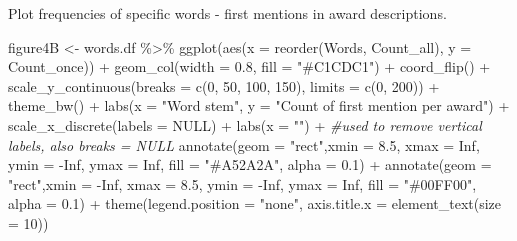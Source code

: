 \documentclass[
]{article}
\newenvironment{Shaded}{\begin{snugshade}}{\end{snugshade}}
\newcommand{\AttributeTok}[1]{\textcolor[rgb]{0.77,0.63,0.00}{#1}}
\newcommand{\CommentTok}[1]{\textcolor[rgb]{0.56,0.35,0.01}{\textit{#1}}}
\newcommand{\ConstantTok}[1]{\textcolor[rgb]{0.00,0.00,0.00}{#1}}
\newcommand{\DecValTok}[1]{\textcolor[rgb]{0.00,0.00,0.81}{#1}}
\newcommand{\FloatTok}[1]{\textcolor[rgb]{0.00,0.00,0.81}{#1}}
\newcommand{\FunctionTok}[1]{\textcolor[rgb]{0.00,0.00,0.00}{#1}}
\newcommand{\NormalTok}[1]{#1}
\newcommand{\OtherTok}[1]{\textcolor[rgb]{0.56,0.35,0.01}{#1}}
\newcommand{\SpecialCharTok}[1]{\textcolor[rgb]{0.00,0.00,0.00}{#1}}
\newcommand{\StringTok}[1]{\textcolor[rgb]{0.31,0.60,0.02}{#1}}
\begin{document}
Plot frequencies of specific words - first mentions in award
descriptions.

\begin{Shaded}
\begin{Highlighting}[]
\NormalTok{figure4B }\OtherTok{\textless{}{-}}\NormalTok{ words.df }\SpecialCharTok{\%\textgreater{}\%}
    \FunctionTok{ggplot}\NormalTok{(}\FunctionTok{aes}\NormalTok{(}\AttributeTok{x =} \FunctionTok{reorder}\NormalTok{(Words, Count\_all), }\AttributeTok{y =}\NormalTok{ Count\_once)) }\SpecialCharTok{+} 
    \FunctionTok{geom\_col}\NormalTok{(}\AttributeTok{width =} \FloatTok{0.8}\NormalTok{, }\AttributeTok{fill =} \StringTok{"\#C1CDC1"}\NormalTok{) }\SpecialCharTok{+}
    \FunctionTok{coord\_flip}\NormalTok{() }\SpecialCharTok{+}
    \FunctionTok{scale\_y\_continuous}\NormalTok{(}\AttributeTok{breaks =} \FunctionTok{c}\NormalTok{(}\DecValTok{0}\NormalTok{, }\DecValTok{50}\NormalTok{, }\DecValTok{100}\NormalTok{, }\DecValTok{150}\NormalTok{), }\AttributeTok{limits =} \FunctionTok{c}\NormalTok{(}\DecValTok{0}\NormalTok{, }\DecValTok{200}\NormalTok{)) }\SpecialCharTok{+}
    \FunctionTok{theme\_bw}\NormalTok{() }\SpecialCharTok{+} 
    \FunctionTok{labs}\NormalTok{(}\AttributeTok{x =} \StringTok{"Word stem"}\NormalTok{, }\AttributeTok{y =} \StringTok{"Count of first mention per award"}\NormalTok{) }\SpecialCharTok{+} 
    \FunctionTok{scale\_x\_discrete}\NormalTok{(}\AttributeTok{labels =} \ConstantTok{NULL}\NormalTok{) }\SpecialCharTok{+} \FunctionTok{labs}\NormalTok{(}\AttributeTok{x =} \StringTok{""}\NormalTok{)  }\SpecialCharTok{+} \CommentTok{\#used to remove vertical labels, also breaks = NULL}
    \FunctionTok{annotate}\NormalTok{(}\AttributeTok{geom =} \StringTok{"rect"}\NormalTok{,}\AttributeTok{xmin =} \FloatTok{8.5}\NormalTok{, }\AttributeTok{xmax =} \ConstantTok{Inf}\NormalTok{, }\AttributeTok{ymin =} \SpecialCharTok{{-}}\ConstantTok{Inf}\NormalTok{, }\AttributeTok{ymax =} \ConstantTok{Inf}\NormalTok{, }\AttributeTok{fill =} \StringTok{"\#A52A2A"}\NormalTok{, }\AttributeTok{alpha =} \FloatTok{0.1}\NormalTok{) }\SpecialCharTok{+}
    \FunctionTok{annotate}\NormalTok{(}\AttributeTok{geom =} \StringTok{"rect"}\NormalTok{,}\AttributeTok{xmin =} \SpecialCharTok{{-}}\ConstantTok{Inf}\NormalTok{, }\AttributeTok{xmax =} \FloatTok{8.5}\NormalTok{, }\AttributeTok{ymin =} \SpecialCharTok{{-}}\ConstantTok{Inf}\NormalTok{, }\AttributeTok{ymax =} \ConstantTok{Inf}\NormalTok{, }\AttributeTok{fill =} \StringTok{"\#00FF00"}\NormalTok{, }\AttributeTok{alpha =} \FloatTok{0.1}\NormalTok{) }\SpecialCharTok{+}
    \FunctionTok{theme}\NormalTok{(}\AttributeTok{legend.position =} \StringTok{"none"}\NormalTok{, }\AttributeTok{axis.title.x =} \FunctionTok{element\_text}\NormalTok{(}\AttributeTok{size =} \DecValTok{10}\NormalTok{))}
\end{Highlighting}
\end{Shaded}
\end{document}
